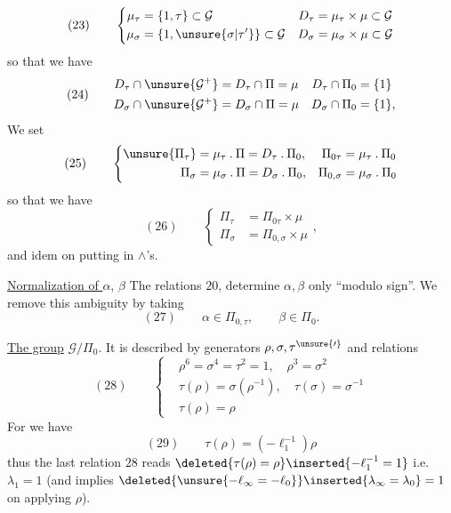 \[
(23)\qquad
\left\{
\begin{aligned}
\mu_\tau&=\{1,\tau\}\subset\mathcal G
&D_\tau&=\mu_\tau\times\mu\subset\mathcal G\\
\mu_\sigma&=\{1,\unsure{\sigma|\tau'}\}\subset\mathcal G
&D_\sigma&=\mu_\sigma\times\mu\subset\mathcal G
\end{aligned}
\right.
\]
so that we have
\[
(24)\qquad
\begin{aligned}
D_\tau\cap\unsure{\mathcal G^+}
&=D_\tau\cap\Pi=\mu
&D_\tau\cap\Pi_0&=\{1\}\\
D_\sigma\cap\unsure{\mathcal G^+}
&=D_\sigma\cap\Pi=\mu
&D_\sigma\cap\Pi_0&=\{1\},
\end{aligned}
\]
We set
\[
(25)\qquad
\left\{
\begin{aligned}
\unsure{\Pi_\tau}&=\mu_\tau\mathbin{.}\Pi=D_\tau\mathbin{.}\Pi_0,
&\Pi_{0\tau}&=\mu_\tau\mathbin{.}\Pi_0\\
\Pi_\sigma&=\mu_\sigma\mathbin{.}\Pi=D_\sigma\mathbin{.}\Pi_0,
&\Pi_{0,\sigma}&=\mu_\sigma\mathbin{.}\Pi_0
\end{aligned}
\right.
\]
so that we have
\[
(26)\qquad
\left\{
\begin{aligned}
\Pi_\tau&=\Pi_{0\tau}\times\mu\\
\Pi_\sigma&=\Pi_{0,\sigma}\times\mu
\end{aligned}
\right.,
\]
and idem on putting in $\wedge$'s.

\uline{Normalization of $\alpha$}, $\beta$\quad
The relations $20$, determine $\alpha,\beta$ only ``modulo sign''.
We remove this ambiguity by taking
\[
(27)\qquad
\alpha\in\Pi_{0,\tau},\qquad\beta\in\Pi_0.
\]

\uline{The group} $\mathcal G/\Pi_0$.
It is described by generators $\rho,\sigma,\tau^{\unsure{\prime}}$ and relations 
\[
(28)\qquad
\left\{
\begin{aligned}
&\rho^6=\sigma^4=\tau^2=1,\quad \rho^3=\sigma^2\\
&\tau(\rho)=\sigma(\rho^{-1}),\quad \tau(\sigma)=\sigma^{-1}\\
&\tau(\rho)=\rho
\end{aligned}
\right.
\]
For we have
\[
(29)\qquad
\tau(\rho)=(-\ell_1^{-1})\rho
\]
thus the last relation $28$ reads
$\deleted{\tau(\rho)=\rho}\inserted{-\ell_1^{-1}=1}$
i.e. $\lambda_1=1$
(and implies
$\deleted{\unsure{-\ell_\infty=-\ell_0}}\inserted{\lambda_\infty=\lambda_0}=1$
on applying $\rho$).



